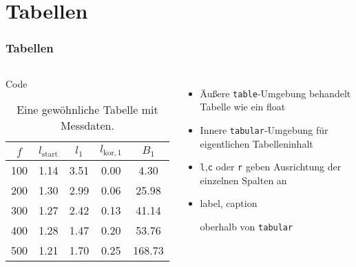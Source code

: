 \section{Tabellen}
\begin{frame}[fragile]
  \frametitle{Tabellen}
  \begin{columns}[T]
    \fontsize{8}{6}
    \begin{block}{Code}
      \begin{lstverbatim}
      \begin{table}
          \centering
          \caption{Eine gewöhnliche Tabelle mit Messdaten.}
          \label{tab:some_data}
          \begin{tabular}{c c c c c}
              \hline
              $f$ & $l_\text{start}$ & $l_1$ & $l_{\text{kor},1}$ & $B_1$ \\
              \hline
              100 & 1.14 & 3.51 & 0.00 & 4.30 \\ 
              200 & 1.30 & 2.99 & 0.06 & 25.98 \\
              300 & 1.27 & 2.42 & 0.13 & 41.14 \\
              400 & 1.28 & 1.47 & 0.20 & 53.76 \\ 
              500 & 1.21 & 1.70 & 0.25 & 168.73 \\
              \hline
          \end{tabular}
      \end{table}
      \end{lstverbatim}
    \end{block}
    \begin{itemize}
      \item Äußere \texttt{table}-Umgebung behandelt Tabelle wie ein float
      \item Innere \texttt{tabular}-Umgebung für eigentlichen Tabelleninhalt
      \item \texttt{l},\texttt{c} oder \texttt{r} geben Ausrichtung der einzelnen Spalten an
      \item 
        \begin{lstverbatim}
        label, caption 
        \end{lstverbatim}
        oberhalb von \texttt{tabular}
    \end{itemize}
  \end{columns}
\end{frame}

